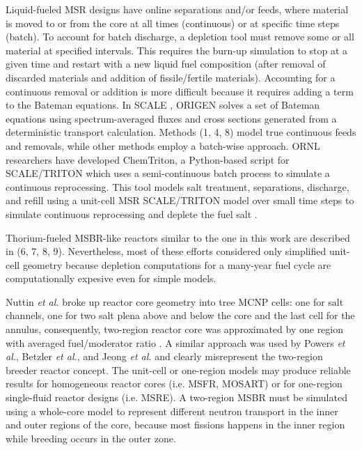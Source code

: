 Liquid-fueled \gls{MSR} designs have online separations and/or feeds, where 
material is moved to or from the core at all times (continuous) or at specific 
time steps (batch). To account for batch discharge, a depletion tool must 
remove some or all material at specified intervals. This requires the burn-up 
simulation to stop at a given time and restart with a new liquid fuel 
composition (after removal of discarded materials and addition of 
fissile/fertile materials). Accounting for a continuous removal or addition is 
more difficult because it requires adding a term to the Bateman equations. In 
SCALE \cite{bowman_scale_2011}, ORIGEN \cite{gauld_isotopic_2011} solves a set 
of Bateman equations using spectrum-averaged fluxes and cross sections 
generated from a deterministic transport calculation. Methods (1, 4, 8) model 
true continuous feeds and removals, while other methods employ a batch-wise 
approach. \gls{ORNL} researchers have developed ChemTriton, a Python-based 
script for SCALE/TRITON which uses a semi-continuous batch process to simulate 
a continuous reprocessing. This tool models salt treatment, separations, 
discharge, and refill using a unit-cell \gls{MSR} SCALE/TRITON model over small 
time steps to simulate continuous reprocessing and deplete the fuel salt 
\cite{powers_new_2013}.

Thorium-fueled \gls{MSBR}-like reactors similar to the one in this work are 
described in (6, 7, 8, 9). Nevertheless, most of these efforts considered only 
simplified unit-cell geometry because depletion computations for a many-year 
fuel cycle are computationally expesive even for simple models. 

Nuttin \emph{et al.} broke up reactor core geometry into tree \gls{MCNP} cells: 
one for salt channels, one for two salt plena above and below the core and the 
last cell for the annulus, consequently, two-region reactor core was 
approximated by one region with averaged fuel/moderator ratio 
\cite{nuttin_potential_2005}.  A similar approach was used by Powers \emph{et 
al.}, Betzler \emph{et al.}, and Jeong \emph{et al.} 
\cite{powers_new_2013,powers_inventory_2014,betzler_modeling_2016, 
betzler_molten_2017, jeong_development_2014, jeong_equilibrium_2016} and 
clearly misrepresent the two-region breeder reactor concept. The unit-cell or 
one-region models may produce reliable results for homogeneous reactor cores 
(i.e. \gls{MSFR}, \gls{MOSART}) or for one-region single-fluid reactor designs 
(i.e. \gls{MSRE}). A two-region \gls{MSBR} must be simulated using a whole-core 
model to represent different neutron transport in the inner and outer regions 
of the core, because most fissions happens in the inner region while breeding 
occurs in the outer zone.  

